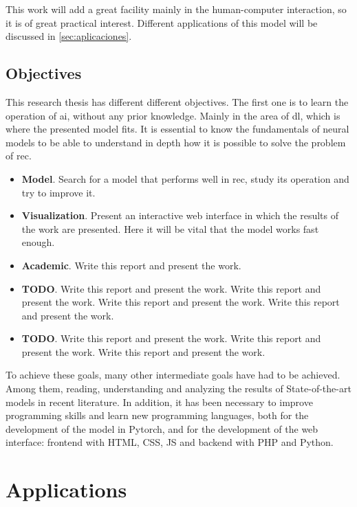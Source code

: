 This work will add a great facility mainly in the human-computer interaction,
so it is of great practical interest. Different applications of this model will
be discussed in \vref{sec:aplicaciones}.


\subsection{Objectives}

This research thesis has different different objectives. The first one is to
learn the operation of \gls{ai}, without any prior knowledge. Mainly in the
area of \gls{dl}, which is where the presented model fits. It is essential to
know the fundamentals of neural models to be able to understand in depth how it
is possible to solve the problem of \gls{rec}.

\begin{itemize}
  \item \textbf{Model}. Search for a model that performs well in \gls{rec},
  study its operation and try to improve it.
  \item \textbf{Visualization}. Present an interactive web interface in which
  the results of the work are presented. Here it will be vital that the model
  works fast enough.
  \item \textbf{Academic}. Write this report and present the work.
  \item \textbf{TODO}. Write this report and present the work.  Write this
  report and present the work.  Write this report and present the work.  Write
  this report and present the work.
  \item \textbf{TODO}. Write this report and present the work.  Write this
  report and present the work.  Write this report and present the work.
\end{itemize}

To achieve these goals, many other intermediate goals have had to be
achieved. Among them, reading, understanding and analyzing the results of
State-of-the-art models in recent literature. In addition, it has been
necessary to improve programming skills and learn new programming languages,
both for the development of the model in Pytorch, and for the development of
the web interface: frontend with HTML, CSS, JS and backend with PHP and Python.



\section{Applications}\label{sec:aplicaciones}

